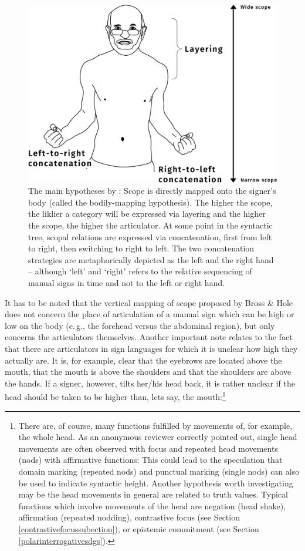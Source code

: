 \begin{figure}[bt]
\centering
	\includegraphics[width=1.0\textwidth]{hyposw.jpg}
	\caption{The main hypotheses by \citet{bross2017scope}: Scope is directly mapped onto the signer's body (called the bodily-mapping hypothesis). The higher the scope, the liklier a category will be expressed via layering and the higher the scope, the higher the articulator. At some point in the syntactic tree, scopal relations are expressed via concatenation, first from left to right, then switching to right to left. The two concatenation strategies are metaphorically depicted as the left and the right hand -- although `left' and `right' refers to the relative sequencing of manual signs in time and not to the left or right hand.}
	\label{hypo}
\end{figure}	

\noindent It has to be noted that the vertical mapping of scope proposed by Bross \& Hole does not concern the place of articulation of a manual sign which can be high or low on the body (e.\,g., the forehead versus the abdominal region), but only concerns the articulators themselves. Another important note relates to the fact that there are articulators in sign languages for which it is unclear how high they actually are. It is, for example, clear that the eyebrows are located above the mouth, that the mouth is above the shoulders and that the shoulders are above the hands. If a signer, however, tilts her/his head back, it is rather unclear if the head should be taken to be higher than, lets say, the mouth:\footnote{ There are, of course, many functions fulfilled by movements of, for example, the whole head. As an anonymous reviewer correctly pointed out, single head movements are often observed with focus and repeated head movements (nods) with affirmative functions: This could lead to the speculation that domain marking (repeated nods) and punctual marking (single nods) can also be used to indicate syntactic height. Another hypothesis worth investigating may be the head movements in general are related to truth values. Typical functions which involve movements of the head are negation (head shake), affirmation (repeated nodding), contrastive focus (see Section \ref{contrastivefocussubection}), or epistemic commitment (see Section \ref{polarinterrogativesdgs}).}\label{nesting}

